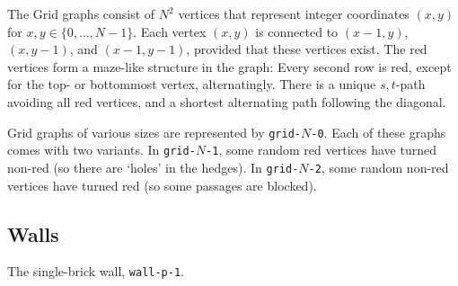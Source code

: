 \documentclass{tufte-handout}
\begin{document}
The Grid graphs consist of $N^2$ vertices that represent integer coordinates $(x,y)$ for $x,y\in\{0,\ldots,N-1\}$.
Each vertex $(x,y)$ is connected to $(x-1,y)$, $(x,y-1)$, and $(x-1,y-1)$, provided that these vertices exist.
The red vertices form a maze-like structure in the graph:
Every second row is red, except for the top- or bottommost vertex, alternatingly.
There is a unique $s,t$-path avoiding all red vertices, and a shortest alternating path following the diagonal.

Grid graphs of various sizes are represented by {\tt grid-$N$-0}.
Each of these graphs comes with two variants.
In {\tt grid-$N$-1}, some random red vertices have turned non-red (so there are `holes' in the hedges).
In {\tt grid-$N$-2}, some random non-red vertices have turned red (so some passages are blocked).


\subsection{Walls}

\begin{marginfigure}
 \caption{The single-brick wall, {\tt wall-p-1}.}
 \end{marginfigure}
\end{document}
